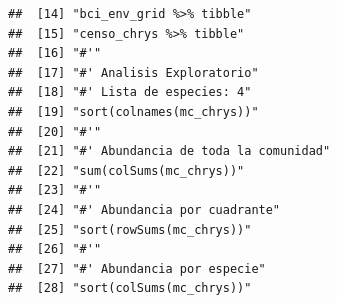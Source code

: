 \documentclass[11pt,]{article}
\begin{document}
\begin{verbatim}
##  [14] "bci_env_grid %>% tibble"                                                                                                                                               
##  [15] "censo_chrys %>% tibble"                                                                                                                                                
##  [16] "#'"                                                                                                                                                                    
##  [17] "#' Analisis Exploratorio"                                                                                                                                              
##  [18] "#' Lista de especies: 4"                                                                                                                                               
##  [19] "sort(colnames(mc_chrys))"                                                                                                                                              
##  [20] "#'"                                                                                                                                                                    
##  [21] "#' Abundancia de toda la comunidad"                                                                                                                                    
##  [22] "sum(colSums(mc_chrys))"                                                                                                                                                
##  [23] "#'"                                                                                                                                                                    
##  [24] "#' Abundancia por cuadrante"                                                                                                                                           
##  [25] "sort(rowSums(mc_chrys))"                                                                                                                                               
##  [26] "#'"                                                                                                                                                                    
##  [27] "#' Abundancia por especie"                                                                                                                                             
##  [28] "sort(colSums(mc_chrys))"                                                                                                                                               

\end{verbatim}
\end{document}
